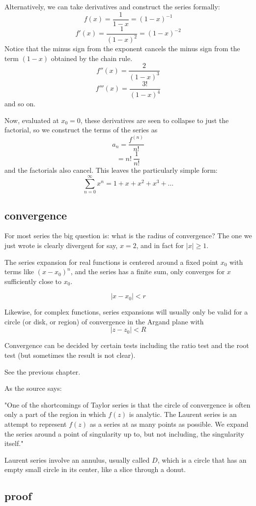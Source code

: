 \documentclass[11pt, oneside]{article}
\begin{document}
Alternatively, we can take derivatives and construct the series formally:
\[ f(x) = \frac{1}{1 - x} = (1-x)^{-1} \]
\[ f'(x) = \frac{1}{(1 - x)^2} = (1-x)^{-2} \]
Notice that the minus sign from the exponent cancels the minus sign from the term $(1-x)$ obtained by the chain rule.  
\[ f''(x) = \frac{2}{(1 - x)^3} \]
\[ f'''(x) = \frac{3!}{(1 - x)^4} \]
and so on.

Now, evaluated at $x_0 = 0$, these derivatives are seen to collapse to just the factorial, so we construct the terms of the series as
\[ a_n = \frac{f^{(n)}}{n!} \]
\[ = n! \ \frac{1}{n!} \]
and the factorials also cancel.  This leaves the particularly simple form:
\[ \sum_{n=0}^{\infty} x^n = 1 + x + x^2 + x^3 + \dots \]

\subsection*{convergence}
For most series the big question is:  what is the radius of convergence?  The one we just wrote is clearly divergent for say, $x = 2$, and in fact for $|x| \ge 1$.

The series expansion for real functions is centered around a fixed point $x_0$ with terms like $(x - x_0)^n$, and the series has a finite sum, only converges for $x$ sufficiently close to $x_0$.

\[ |x - x_0| < r \]

Likewise, for complex functions, series expansions will usually only be valid for a circle (or disk, or region) of convergence in the Argand plane with 
\[ | z - z_0 | < R \]

Convergence can be decided by certain tests including the ratio test and the root test (but sometimes the result is not clear).

See the previous chapter.

As the source says:  

"One of the shortcomings of Taylor series is that the circle of convergence is often only a part of the region in which $f(z)$ is analytic.  The Laurent series is an attempt to represent $f(z)$ as a series at as many points as possible. We expand the series around a point of singularity up to, but not including, the singularity itself."

Laurent series involve an annulus, usually called $D$, which is a circle that has an empty small circle in its center, like a slice through a donut.

\subsection*{proof}
\end{document}
